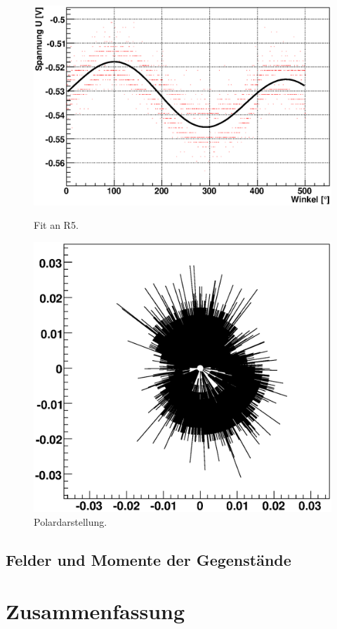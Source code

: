 \documentclass[12pt]{article}
\begin{document}
\begin{figure}[H]  
\begin{minipage}{0.5\linewidth}
\centering
\includegraphics[width=0.9\linewidth]{pictures/R5.eps}
\caption{Fit an R5.}
\end{minipage}
\begin{minipage}{0.5\linewidth}
\centering 
\includegraphics[width=0.9\linewidth]{pictures/R5vd.eps}
\caption{Polardarstellung.}
\end{minipage}
\end{figure}

\subsection{Felder und Momente der Gegenstände}




\section{Zusammenfassung}
\end{document}

